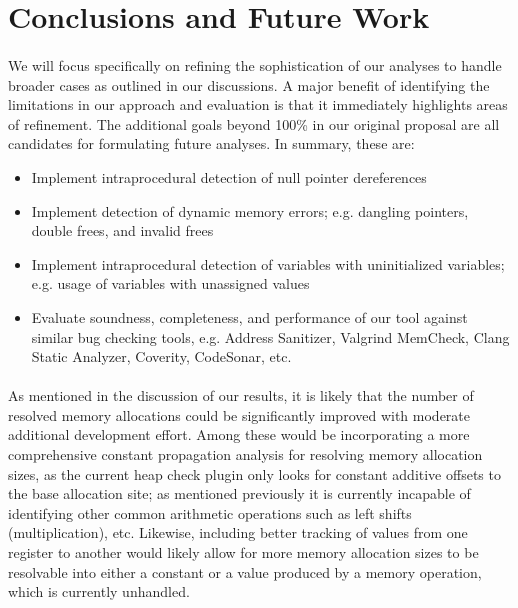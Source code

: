 \documentclass[letterpaper,11pt]{article}
\begin{document}
\section{Conclusions and Future Work}
\paragraph{}
We will focus specifically on refining the sophistication of our analyses
to handle broader cases as outlined in our discussions. A major benefit of
identifying the limitations in our approach and evaluation is that it
immediately highlights areas of refinement. The additional goals beyond 100\%
in our original proposal are all candidates for formulating future analyses.
In summary, these are:

\begin{itemize}
  \item Implement intraprocedural detection of null pointer dereferences
  \item  Implement detection of dynamic memory errors; e.g. dangling pointers,
double frees, and invalid frees
\item Implement intraprocedural detection of variables with uninitialized
variables; e.g. usage of variables with unassigned values
\item Evaluate soundness, completeness, and performance of our tool
  against similar bug checking tools, e.g. Address Sanitizer, Valgrind
  MemCheck, Clang Static Analyzer, Coverity, CodeSonar, etc.
\end{itemize}

\paragraph{}
As mentioned in the discussion of our results, it is likely that the number of
resolved memory allocations could be significantly improved with moderate
additional development effort. Among these would be incorporating a more
comprehensive constant propagation analysis for resolving memory allocation
sizes, as the current heap check plugin only looks for constant additive
offsets to the base allocation site; as mentioned previously it is currently
incapable of identifying other common arithmetic operations such as left shifts
(multiplication), etc. Likewise, including better tracking of values from one
register to another would likely allow for more memory allocation sizes to be
resolvable into either a constant or a value produced by a memory operation,
which is currently unhandled.
\end{document}
